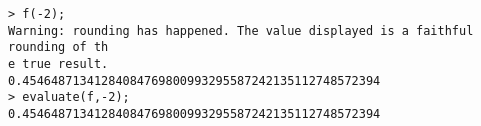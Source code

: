 \begin{center}\begin{minipage}{15cm}\begin{Verbatim}[frame=single]
> f(-2);
Warning: rounding has happened. The value displayed is a faithful rounding of th
e true result.
0.45464871341284084769800993295587242135112748572394
> evaluate(f,-2);
0.45464871341284084769800993295587242135112748572394
\end{Verbatim}
\end{minipage}\end{center}
